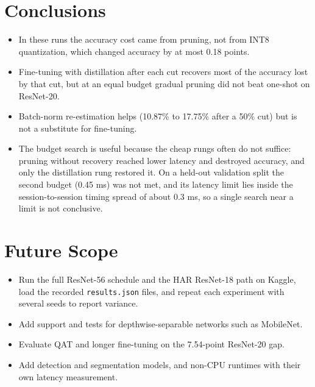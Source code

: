 \documentclass[oneside,a4paper,12pt]{report}
\newcommand{\code}[1]{\texttt{\small #1}}
\begin{document}
\section{Conclusions}
\begin{itemize}
\item In these runs the accuracy cost came from pruning, not from INT8 quantization, which changed accuracy by at most 0.18 points.
\item Fine-tuning with distillation after each cut recovers most of the accuracy lost by that cut, but at an equal budget gradual pruning did not beat one-shot on ResNet-20.
\item Batch-norm re-estimation helps (10.87\% to 17.75\% after a 50\% cut) but is not a substitute for fine-tuning.
\item The budget search is useful because the cheap rungs often do not suffice: pruning without recovery reached lower latency and destroyed accuracy, and only the distillation rung restored it. On a held-out validation split the second budget (0.45 ms) was not met, and its latency limit lies inside the session-to-session timing spread of about 0.3 ms, so a single search near a limit is not conclusive.
\end{itemize}

\section{Future Scope}
\begin{itemize}
\item Run the full ResNet-56 schedule and the HAR ResNet-18 path on Kaggle, load the recorded \code{results.json} files, and repeat each experiment with several seeds to report variance.
\item Add support and tests for depthwise-separable networks such as MobileNet.
\item Evaluate QAT and longer fine-tuning on the 7.54-point ResNet-20 gap.
\item Add detection and segmentation models, and non-CPU runtimes with their own latency measurement.
\end{itemize}
\end{document}

